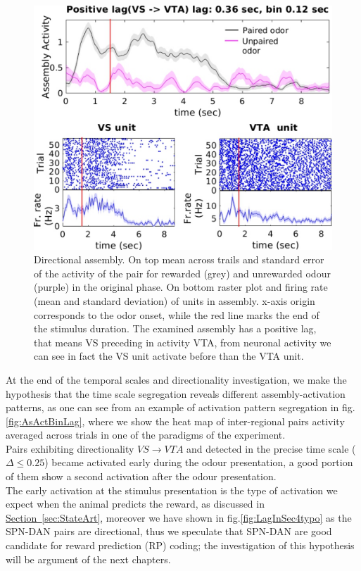 \begin{figure}
    \centering
    \includegraphics[scale=0.5]{figures/DirectionalAsEx1.pdf}
    \caption{Directional assembly. On top mean across trails and standard error of the activity of the pair for rewarded (grey) and unrewarded odour (purple) in the original phase. On bottom raster plot and firing rate (mean and standard deviation) of units in assembly. x-axis origin corresponds to the odor onset, while the red line marks the end of the stimulus duration. The examined assembly has a positive lag, that means VS preceding in activity VTA, from neuronal activity we can see in fact the VS unit activate before than the VTA unit.}
    \label{fig:directional_assembly}
\end{figure}
At the end of the temporal scales and directionality investigation, we make the hypothesis that the time scale segregation reveals different assembly-activation patterns, as one can see from an example of activation pattern segregation in fig.\ref{fig:AsActBinLag}, where we show the heat map of inter-regional pairs activity averaged across trials in one of the paradigms of the experiment.\\Pairs exhibiting directionality $VS \rightarrow VTA$ and detected in the precise time scale ($\Delta \le 0.25$) became activated early during the odour presentation, a good portion of them show a second activation after the odour presentation.\\The early activation at the stimulus presentation is the type of activation we expect when the animal predicts the reward, as discussed in \hyperref[sec:StateArt]{Section~\ref*{sec:StateArt}}, moreover we have shown in fig.\ref{fig:LagInSec4typo} as the SPN-DAN pairs are directional, thus we speculate that SPN-DAN are good candidate for reward prediction (RP) coding; the investigation of this hypothesis will be argument of the next chapters.\\
